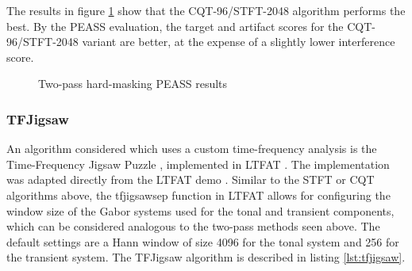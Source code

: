 \documentclass[letter,12pt]{article}
\begin{document}
The results in figure \ref{fig:round2hard} show that the CQT-96/STFT-2048 algorithm performs the best. By the PEASS evaluation, the target and artifact scores for the CQT-96/STFT-2048 variant are better, at the expense of a slightly lower interference score.

\begin{figure}[ht]
	\centering
	\caption{Two-pass hard-masking PEASS results}
	\label{fig:round2hard}
\end{figure}

\subsubsection{TFJigsaw}

An algorithm considered which uses a custom time-frequency analysis is the Time-Frequency Jigsaw Puzzle \cite{tfjigsaw}, implemented in LTFAT \cite{tfjigsaw2}. The implementation was adapted directly from the LTFAT demo \cite{tfjigsaw3}. Similar to the STFT or CQT algorithms above, the tfjigsawsep function in LTFAT allows for configuring the window size of the Gabor systems used for the tonal and transient components, which can be considered analogous to the two-pass methods seen above. The default settings are a Hann window of size 4096 for the tonal system and 256 for the transient system. The TFJigsaw algorithm is described in listing \ref{lst:tfjigsaw}.
\end{document}
